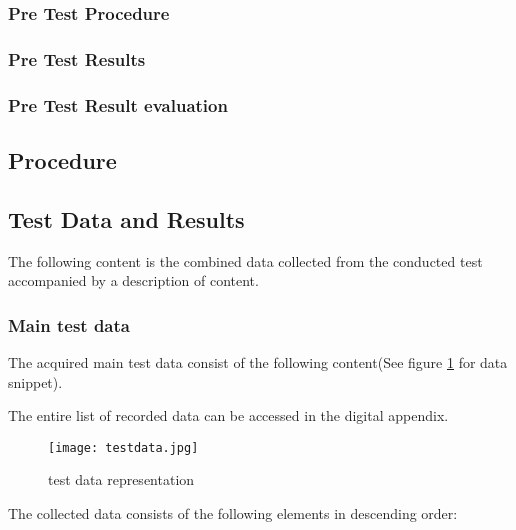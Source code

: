 \subsubsection{Pre Test Procedure}
\subsubsection{Pre Test Results}
\subsubsection{Pre Test Result evaluation}

\subsection{Procedure}

\newpage
\subsection{Test Data and Results}
The following content is the combined data collected from the conducted test accompanied by a description of content.

\subsubsection{Main test data}
The acquired main test data consist of the following content(See figure \ref{fig:testdata} for data snippet).

The entire list of recorded data can be accessed in the digital appendix.

\begin{figure}[!htbp]
\centering
\texttt{[image: testdata.jpg]}
\caption{test data representation}
\label{fig:testdata}
\end{figure}


\newpage

The collected data consists of the following elements in descending order:

